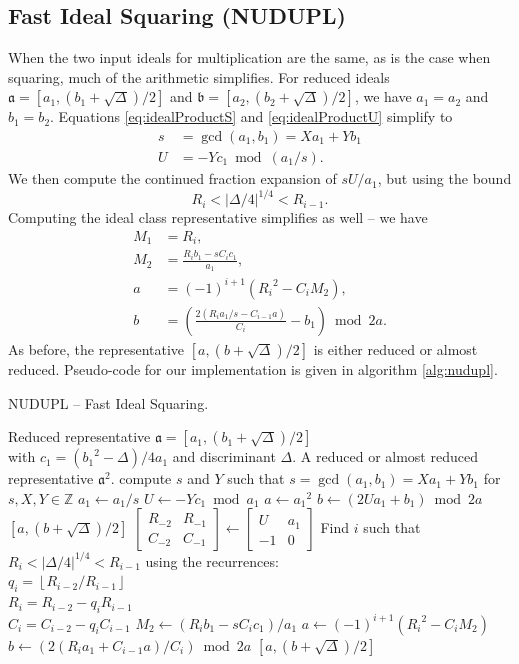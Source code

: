 \documentclass{ucalgthes1}
\theoremstyle{definition}
\newcommand{\ZZ}{\mathbb{Z}}
\newcommand{\matrixtt}[4]{\left[ \begin{array}{rr} #1 & #2 \\ #3 & #4 \end{array} \right]}
\newcommand{\floor}[1]{\left\lfloor #1 \right\rfloor}
\begin{document}
\subsection{Fast Ideal Squaring (NUDUPL)}
\label{subsec:nudupl}

When the two input ideals for multiplication are the same, as is the case when squaring, much of the arithmetic simplifies.  For reduced ideals $\mathfrak a = [a_1, (b_1 + \sqrt\Delta)/2]$ and $\mathfrak b = [a_2, (b_2 + \sqrt\Delta)/2]$, we have $a_1=a_2$ and $b_1=b_2$.  Equations \ref{eq:idealProductS} and \ref{eq:idealProductU} simplify to
\begin{align*}
	s &= \gcd(a_1, b_1) = Xa_1 + Yb_1 \\
	U &= -Yc_1 \bmod (a_1/s).
\end{align*}
We then compute the continued fraction expansion of $sU/a_1$, but using the bound
\[
	R_i < |\Delta/4|^{1/4} < R_{i-1}.
\]
Computing the ideal class representative simplifies as well -- we have
\begin{align*}
	M_1 &= R_i, \\
	M_2 &= \frac{R_i b_1 - sC_i c_1}{a_1}, \\
	a &= (-1)^{i+1}({R_i}^2 - C_i M_2), \\
	b &= \left(\frac{2(R_i a_1/s  - C_{i-1} a)}{C_i} - b_1 \right) \bmod{2a}.
\end{align*}
As before, the representative $[a, (b+\sqrt\Delta)/2]$ is either reduced or almost reduced.  \break Pseudo-code for our implementation is given in algorithm \ref{alg:nudupl}.

\begin{algorithm}[h]
\caption{NUDUPL -- Fast Ideal Squaring.}
\label{alg:nudupl}
\begin{algorithmic}[1]
\REQUIRE Reduced representative $\mathfrak a = [a_1, (b_1+\sqrt\Delta)/2]$ \\
         with $c_1 = ({b_1}^2-\Delta)/4a_1$ and discriminant $\Delta$.
\ENSURE A reduced or almost reduced representative $\mathfrak a^2$.
\STATE compute $s$ and $Y$ such that $s = \gcd(a_1, b_1) = Xa_1 + Yb_1$ for $s,X,Y \in \ZZ$
\STATE $a_1 \gets a_1/s$
\STATE $U \gets -Yc_1 \bmod a_1$
	\STATE $a \gets {a_1}^2$
	\STATE $b \gets (2Ua_1 + b_1) \bmod 2a$
	\RETURN $[a, (b + \sqrt\Delta)/2]$
\ENDIF
\STATE $\matrixtt{R_{-2}}{R_{-1}}{C_{-2}}{C_{-1}} \gets \matrixtt{U}{a_1}{-1}{0}$
\STATE Find $i$ such that $R_i < |\Delta/4|^{1/4} < R_{i-1}$ using the recurrences: \\
       $q_i = \floor{R_{i-2}/R_{i-1}}$ \\
       $R_i = R_{i-2}-q_i R_{i-1}$ \\
       $C_i=C_{i-2}-q_i C_{i-1}$
\STATE $M_2 \gets (R_i b_1 -sC_i c_1)/a_1$
\STATE $a \gets (-1)^{i+1}({R_i}^2 - C_i M_2)$
\STATE $b \gets (2(R_i a_1 + C_{i-1} a)/C_i) \bmod{2a}$
\RETURN $[a, (b+\sqrt\Delta)/2]$
\end{algorithmic}
\end{algorithm}
\end{document}
